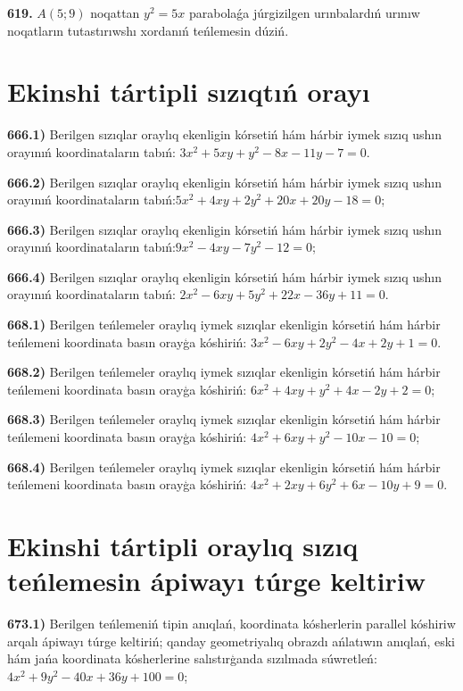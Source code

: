 \textbf{619.} $A (5;9) $ noqattan $y^2=5x$ parabolaǵa júrgizilgen urınbalardıń urınıw noqatların tutastırıwshı xordanıń teńlemesin dúziń.


\section{ Ekinshi tártipli sızıqtıń orayı }


\textbf{666.1)} Berilgen sızıqlar oraylıq ekenligin kórsetiń hám hárbir iymek sızıq ushın orayınıń koordinataların tabıń: $3x^2+5xy+y^2-8x-11y-7=0$.

\textbf{666.2)} Berilgen sızıqlar oraylıq ekenligin kórsetiń hám hárbir iymek sızıq ushın orayınıń koordinataların tabıń:$5 x^2+4 x y+2 y^2+20 x+20 y-18=0$;

\textbf{666.3)} Berilgen sızıqlar oraylıq ekenligin kórsetiń hám hárbir iymek sızıq ushın orayınıń koordinataların tabıń:$9 x^2-4 x y-7 y^2-12=0$;

\textbf{666.4)} Berilgen sızıqlar oraylıq ekenligin kórsetiń hám hárbir iymek sızıq ushın orayınıń koordinataların tabıń: $2 x^2-6 x y+5 y^2+22 x-36 y+11=0$.

\textbf{668.1)} Berilgen teńlemeler oraylıq iymek sızıqlar ekenligin kórsetiń hám hárbir teńlemeni koordinata basın orayģa kóshiriń: $3x^2-6xy+2y^2-4x+2y+1=0$.

\textbf{668.2)} Berilgen teńlemeler oraylıq iymek sızıqlar ekenligin kórsetiń hám hárbir teńlemeni koordinata basın orayģa kóshiriń: $6 x^2+4 x y+y^2+4 x-2 y+2=0$;

\textbf{668.3)} Berilgen teńlemeler oraylıq iymek sızıqlar ekenligin kórsetiń hám hárbir teńlemeni koordinata basın orayģa kóshiriń: $4 x^2+6 x y+y^2-10 x-10=0$;

\textbf{668.4)} Berilgen teńlemeler oraylıq iymek sızıqlar ekenligin kórsetiń hám hárbir teńlemeni koordinata basın orayģa kóshiriń:  $4 x^2+2 x y+6 y^2+6 x-10 y+9=0$.



\section{ Ekinshi tártipli oraylıq sızıq teńlemesin ápiwayı túrge keltiriw}

\textbf{673.1)} Berilgen teńlemeniń tipin anıqlań, koordinata kósherlerin parallel kóshiriw arqalı ápiwayı túrge keltiriń; qanday geometriyalıq obrazdı ańlatıwın anıqlań, eski hám jańa koordinata kósherlerine salıstırģanda sızılmada súwretleń: $4 x^2+9 y^2-40 x+36 y+100=0$;

